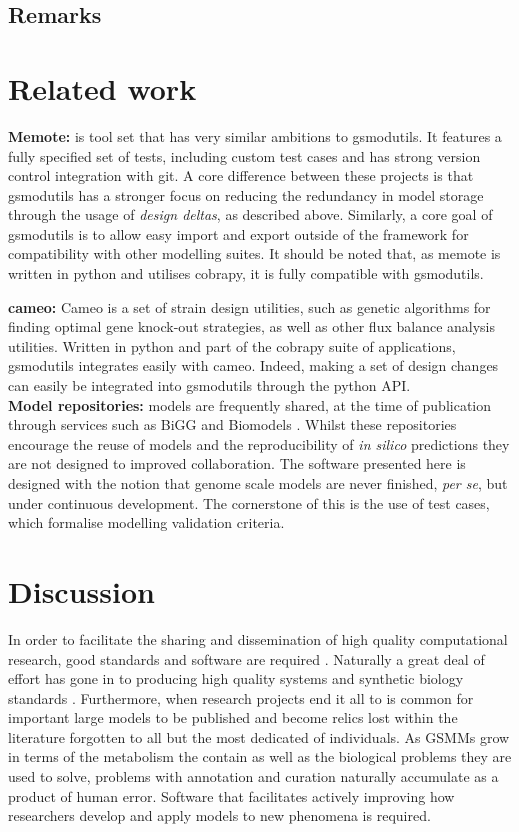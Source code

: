 \documentclass[a4paper,10pt]{article}
\begin{document}
\subsection{Remarks}
 
\section{Related work}
\textbf{Memote:} \cite{lieven2017memote} is tool set that has very similar ambitions to gsmodutils.
It features a fully specified set of tests, including custom test cases and has strong version control integration with git.
A core difference between these projects is that gsmodutils has a stronger focus on reducing the redundancy in model storage through the usage of \textit{design deltas}, as described above.
Similarly, a core goal of gsmodutils is to allow easy import and export outside of the framework for compatibility with other modelling suites.
It should be noted that, as memote is written in python and utilises cobrapy, it is fully compatible with gsmodutils.

\textbf{cameo:} Cameo \cite{cardoso2017cameo} is a set of strain design utilities, such as genetic algorithms for finding optimal gene knock-out
strategies, as well as other flux balance analysis utilities. Written in python and part of the cobrapy suite of applications,
gsmodutils integrates easily with cameo.
Indeed, making a set of design changes can easily be integrated into gsmodutils through the python API.
\\
\textbf{Model repositories:} models are frequently shared, at the time of publication through services such as BiGG \cite{king2015bigg} and Biomodels \cite{chelliah2013biomodels}. 
Whilst these repositories encourage the reuse of models and the reproducibility of \textit{in silico} predictions they are not designed to improved collaboration.
The software presented here is designed with the notion that genome scale models are never finished, \textit{per se}, but under continuous development.
The cornerstone of this is the use of test cases, which formalise modelling validation criteria.


\section{Discussion}
In order to facilitate the sharing and dissemination of high quality computational research, good standards and software are required \cite{jimenez2017four}.
Naturally a great deal of effort has gone in to producing high quality systems and synthetic biology standards \cite{hucka2003systems, cox2018synthetic}.
Furthermore, when research projects end it all to is common for important large models to be published and become relics lost within the literature forgotten to all but the most dedicated of individuals.
As GSMMs grow in terms of the metabolism the contain as well as the biological problems they are used to solve, problems with annotation and curation naturally accumulate as a product of human error.
Software that facilitates actively improving how researchers develop and apply models to new phenomena is required.
\end{document}
